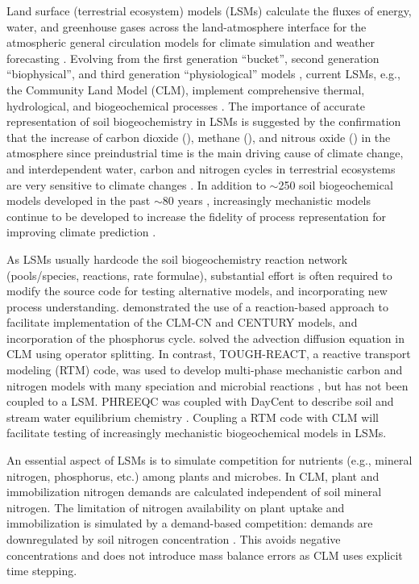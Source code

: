 \documentclass[gmd, manuscript]{copernicus}
\begin{document}
\introduction  %
Land surface (terrestrial ecosystem) models (LSMs) calculate the fluxes of
energy, water, and greenhouse gases across the land-atmosphere interface for
the atmospheric general circulation models for climate simulation and weather
forecasting \citep{Sellers1997}. Evolving from the first generation ``bucket'',
second generation ``biophysical'', and third generation ``physiological''
models \citep{Seneviratne2010}, current LSMs, e.g., the Community Land Model
(CLM), implement comprehensive thermal, hydrological, and biogeochemical
processes \citep{Oleson2013}. The importance of accurate representation of soil biogeochemistry in LSMs is
suggested by the confirmation that the increase of carbon dioxide
(), methane (), and nitrous oxide () in the
atmosphere since preindustrial time is the main driving cause of climate
change, and interdependent water, carbon and nitrogen cycles in terrestrial
ecosystems are very sensitive to climate changes \citep{IPCC2013}. In addition
to $\sim$250 soil biogeochemical models developed in the past $\sim$80 years
\citep{Manzoni2009}, increasingly mechanistic models continue to be developed
to increase the fidelity of process representation for improving
climate prediction \citep[e.g.,][]{Riley2014}. 

As LSMs usually hardcode the soil biogeochemistry reaction network (pools/species, reactions, rate
formulae), substantial effort is often required to modify the source code for
testing alternative models, and incorporating new process
understanding. \citet{Fang2013} demonstrated the use of a reaction-based approach
to facilitate implementation of the CLM-CN and CENTURY models, and incorporation of
the phosphorus cycle.  \citet{Tang2013b} solved the advection diffusion equation in
CLM using operator splitting. In contrast, TOUGH-REACT, a reactive transport
modeling (RTM) code, was used to develop multi-phase mechanistic carbon and
nitrogen models with many speciation and microbial reactions
\citep{Maggi2008,Gu2010,Riley2014}, but has not been coupled to a LSM. PHREEQC
was coupled with DayCent to describe  soil and stream water equilibrium
chemistry  \citep{Hartman2007}. Coupling a RTM code with CLM will facilitate
testing of increasingly mechanistic biogeochemical models in LSMs.

An essential aspect of LSMs is to simulate competition for nutrients (e.g.,
mineral nitrogen, phosphorus, etc.) among plants and microbes. In CLM,  plant
and immobilization nitrogen demands are calculated independent of soil mineral
nitrogen. The limitation of nitrogen availability on plant uptake and
immobilization is simulated by a demand-based competition: demands are
downregulated by soil nitrogen concentration \citep{Oleson2013,Thornton2005}.
This avoids negative concentrations and does not introduce mass balance errors
\citep{Tang2015} as CLM uses explicit time stepping. 
\end{document}
